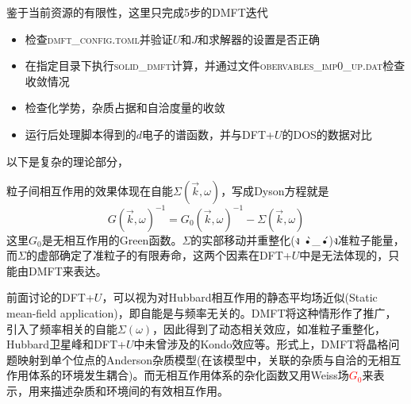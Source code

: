 鉴于当前资源的有限性，这里只完成5步的\textrm{DMFT}迭代
\begin{itemize}
	\item 检查\textsc{dmft\_config.toml}并验证$U$和$J$和求解器的设置是否正确
	\item 在指定目录下执行\textsc{solid\_dmft}计算，并通过文件\textsc{obervables\_imp0\_up.dat}检查收敛情况
	\item 检查化学势，杂质占据和自洽度量的收敛
	\item 运行后处理脚本得到的$d$电子的谱函数，并与\textrm{DFT+}$U$的\textrm{DOS}的数据对比
\end{itemize}
以下是复杂的理论部分，%

粒子间相互作用的效果体现在自能$\Sigma(\vec k,\omega)$，写成\textrm{Dyson}方程就是
\begin{displaymath}
	G(\vec k,\omega)^{-1}=G_0(\vec k,\omega)^{-1}-\Sigma(\vec k,\omega)
\end{displaymath}
这里$G_0$是无相互作用的\textrm{Green}函数。$\Sigma$的实部移动并重整化(ง •̀_•́)ง准粒子能量，而$\Sigma$的虚部确定了准粒子的有限寿命，这两个因素在\textrm{DFT+}$U$中是无法体现的，只能由\textrm{DMFT}来表达。

前面讨论的\textrm{DFT+}$U$，可以视为对\textrm{Hubbard}相互作用的静态平均场近似\textrm{(Static mean-field application)}，即自能是与频率无关的。\textrm{DMFT}将这种情形作了推广，引入了频率相关的自能$\Sigma(\omega)$，因此得到了动态相关效应，如准粒子重整化，\textrm{Hubbard}卫星峰和\textrm{DFT+}$U$中未曾涉及的\textrm{Kondo}效应等。形式上，\textrm{DMFT}将晶格问题映射到单个位点的\textrm{Anderson}杂质模型(在该模型中，关联的杂质与自洽的无相互作用体系的环境发生耦合)。而无相互作用体系的杂化函数又用\textrm{Weiss}场\textcolor{red}{$G_0$}来表示，用来描述杂质和环境间的有效相互作用。

